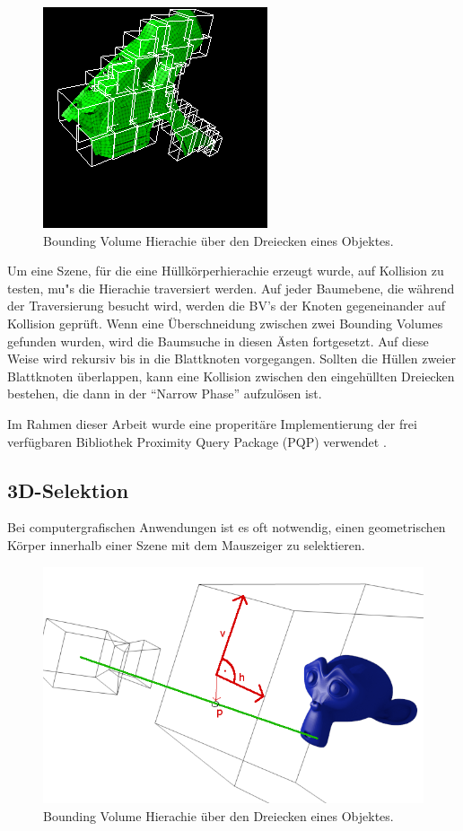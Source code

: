 \begin{figure}[H]
\centerline{
	\includegraphics[scale=0.7]{graphics/BV-Hierarchie5.png}
}
\caption{Bounding Volume Hierachie \"uber den Dreiecken eines Objektes.}
\label{bvho}
\end{figure}

Um eine Szene, f\"ur die eine H\"ullk\"orperhierachie erzeugt wurde, auf Kollision zu testen, mu"s die Hierachie traversiert werden. Auf jeder Baumebene, die w\"ahrend der Traversierung besucht wird,  werden die BV's der Knoten
gegeneinander auf Kollision gepr\"uft. Wenn eine \"Uberschneidung zwischen zwei Bounding Volumes gefunden wurden, wird
die Baumsuche in diesen \"Asten fortgesetzt. Auf diese Weise wird rekursiv bis in die Blattknoten vorgegangen. Sollten die H\"ullen zweier Blattknoten \"uberlappen, kann eine Kollision zwischen den eingeh\"ullten Dreiecken bestehen, die dann in der "`Narrow Phase"' aufzul\"osen ist.

Im Rahmen dieser Arbeit wurde eine properit\"are Implementierung der frei verf\"ugbaren Bibliothek Proximity Query
Package (PQP) verwendet \cite{PQP}.

\subsection{3D-Selektion}
\label{picking}

Bei computergrafischen Anwendungen ist es oft notwendig, einen geometrischen K\"orper innerhalb einer Szene mit dem Mauszeiger zu selektieren. 

\begin{figure}[H]
\centerline{
	\includegraphics[scale=0.7]{graphics/raypicking.png}
}
\caption{Bounding Volume Hierachie \"uber den Dreiecken eines Objektes.}
\label{rayPicking}
\end{figure}

